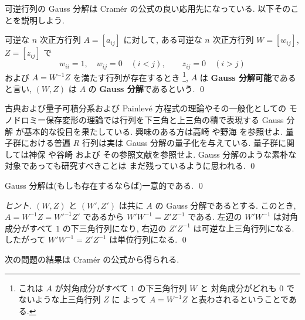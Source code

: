 \documentclass[12pt,twoside]{jarticle}
\begin{document}
可逆行列の Gauss 分解は Cram\'er の公式の良い応用先になっている.
以下そのことを説明しよう.

\begin{definition}[Gauss 分解]
  \label{def:Gauss-decomposition}
  可逆な $n$ 次正方行列 $A = [a_{ij}]$ に対して,
  ある可逆な $n$ 次正方行列 $W=[w_{ij}]$, $Z=[z_{ij}]$ で
  \begin{equation*}
    w_{ii} = 1, \quad w_{ij}=0 \quad (i<j),
    \qquad
    z_{ij}=0 \quad (i>j)
  \end{equation*}
  および $A = W^{-1}Z$ を満たす行列が存在するとき%
  \footnote{これは $A$ が対角成分がすべて $1$ の下三角行列 $W$ と
    対角成分がどれも $0$ でないような上三角行列 $Z$ に
    よって $A=W^{-1}Z$ と表わされるということである.}, %
  $A$ は {\bf Gauss 分解可能}であると言い, $(W,Z)$ は $A$ の 
  {\bf Gauss 分解}であるという.  
  \qed
\end{definition}

\begin{guide}
  古典および量子可積分系および Painlev\'e 方程式の理論やその一般化としての
  モノドロミー保存変形の理論では行列を下三角と上三角の積で表現する Gauss 分解
  が基本的な役目を果たしている.
  興味のある方は高崎 \cite{Takasaki} や野海 \cite{Noumi} を参照せよ.
  量子群における普遍 $R$ 行列は実は Gauss 分解の量子化を与えている.
  量子群に関しては神保 \cite{Jimbo} や谷崎 \cite{Tanisaki} および
  その参照文献を参照せよ.
  Gauss 分解のような素朴な対象であっても研究すべきことは
  まだ残っているように思われる.
  \qed
\end{guide}


\begin{question}
  Gauss 分解は(もしも存在するならば)一意的である. \qed
\end{question}

\begin{proof}[ヒント]
  $(W,Z)$ と $(W',Z')$ は共に $A$ の Gauss 分解であるとする.
  このとき, $A=W^{-1}Z=W'^{-1}Z'$ であるから $W'W^{-1}=Z'Z^{-1}$ である.
  左辺の $W'W^{-1}$ は対角成分がすべて $1$ の下三角行列になり,
  右辺の $Z'Z^{-1}$ は可逆な上三角行列になる.
  したがって $W'W^{-1}=Z'Z^{-1}$ は単位行列になる.
  \qed
\end{proof}


次の問題の結果は Cram\'er の公式から得られる.
\end{document}
